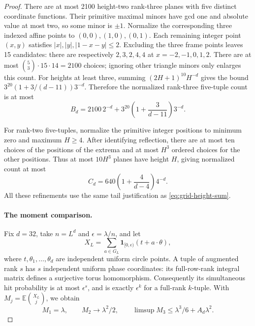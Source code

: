 \documentclass[11pt]{article}
\theoremstyle{definition}
\theoremstyle{remark}
\newcommand{\E}{\mathbb E}
\begin{document}
\begin{proof}
There are at most 2100 height-two rank-three planes with five distinct
coordinate functions. Their primitive maximal minors have gcd one
and absolute value at most two, so some minor is $\pm1$. Normalize
the corresponding three indexed affine points to $(0,0),(1,0),(0,1)$.
Each remaining integer point $(x,y)$ satisfies
$|x|,|y|,|1-x-y|\le2$. Excluding the three frame points leaves 15
candidates: there are respectively $2,3,2,4,4$ at
$x=-2,-1,0,1,2$. There are at most $\binom53\cdot15\cdot14=2100$
choices; ignoring other triangle minors only enlarges this count.
For heights at least three, summing $(2H+1)^{10}H^{-d}$ gives the bound
$3^{20}(1+3/(d-11))3^{-d}$. Therefore the normalized rank-three
five-tuple count is at most
\begin{equation}\label{eq:grid-Bd}
B_d=2100\,2^{-d}
+3^{20}\left(1+\frac3{d-11}\right)3^{-d}.
\end{equation}

For rank-two five-tuples, normalize the primitive integer positions
to minimum zero and maximum $H\ge4$. After identifying reflection,
there are at most ten choices of the positions of the extrema and
at most $H^3$ ordered choices for the other positions. Thus at most
$10H^3$ planes have height $H$, giving normalized count at most
\begin{equation}\label{eq:grid-Cd}
C_d=640\left(1+\frac4{d-4}\right)4^{-d}.
\end{equation}
All these refinements use the same tail justification as
\eqref{eq:grid-height-sum}.

\paragraph{The moment comparison.}
Fix $d=32$, take $n=L^d$ and $\epsilon=\lambda/n$, and let
\[
X_L=\sum_{a\in G_L}\mathbf1_{[0,\epsilon)}(t+a\cdot\theta),
\]
where $t,\theta_1,\ldots,\theta_d$ are independent uniform circle
points. A tuple of augmented rank $s$ has $s$ independent uniform
phase coordinates: its full-row-rank integral matrix defines a
surjective torus homomorphism. Consequently its simultaneous hit
probability is at most $\epsilon^s$, and is exactly $\epsilon^k$
for a full-rank $k$-tuple. With $M_j=\E\binom{X_L}{j}$, we obtain
\[
M_1=\lambda,\qquad M_2\longrightarrow\lambda^2/2,\qquad
\limsup M_3\le\lambda^3/6+A_d\lambda^2.
\]


\end{proof}
\end{document}
